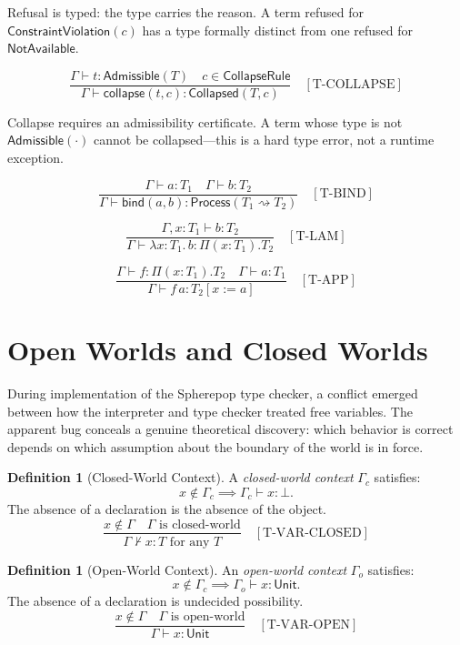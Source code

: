 \documentclass[12pt, a4paper, openany]{book}
\theoremstyle{plain}
\theoremstyle{definition}
\newtheorem{definition}[theorem]{Definition}
\theoremstyle{remark}
\newcommand{\Adm}{\mathsf{Admissible}}
\newcommand{\Col}{\mathsf{Collapsed}}
\newcommand{\Proc}{\mathsf{Process}}
\begin{document}
Refusal is typed: the type carries the reason. A term refused for
$\mathsf{ConstraintViolation}(c)$ has a type formally distinct from one refused
for $\mathsf{NotAvailable}$.

\[
\frac{\Gamma \vdash t : \Adm(T) \quad c \in \mathsf{CollapseRule}}{\Gamma \vdash \mathsf{collapse}(t, c) : \Col(T, c)} \quad [\mathrm{T\text{-}COLLAPSE}]
\]

Collapse requires an admissibility certificate. A term whose type is not
$\Adm(\cdot)$ cannot be collapsed---this is a hard type error, not a runtime
exception.

\[
\frac{\Gamma \vdash a : T_1 \quad \Gamma \vdash b : T_2}{\Gamma \vdash \mathsf{bind}(a, b) : \Proc(T_1 \rightsquigarrow T_2)} \quad [\mathrm{T\text{-}BIND}]
\]

\[
\frac{\Gamma, x : T_1 \vdash b : T_2}{\Gamma \vdash \lambda x : T_1.\, b : \Pi(x : T_1).T_2} \quad [\mathrm{T\text{-}LAM}]
\]

\[
\frac{\Gamma \vdash f : \Pi(x : T_1).T_2 \quad \Gamma \vdash a : T_1}{\Gamma \vdash f\, a : T_2[x := a]} \quad [\mathrm{T\text{-}APP}]
\]

\section{Open Worlds and Closed Worlds}

During implementation of the Spherepop type checker, a conflict emerged between
how the interpreter and type checker treated free variables. The apparent bug
conceals a genuine theoretical discovery: which behavior is correct depends on
which assumption about the boundary of the world is in force.

\begin{definition}[Closed-World Context]
A \emph{closed-world context} $\Gamma_c$ satisfies:
\[
x \notin \Gamma_c \implies \Gamma_c \vdash x : \bot.
\]
The absence of a declaration is the absence of the object.
\[
\frac{x \notin \Gamma \quad \Gamma \text{ is closed-world}}{\Gamma \not\vdash x : T \text{ for any } T} \quad [\mathrm{T\text{-}VAR\text{-}CLOSED}]
\]
\end{definition}

\begin{definition}[Open-World Context]
An \emph{open-world context} $\Gamma_o$ satisfies:
\[
x \notin \Gamma_c \implies \Gamma_o \vdash x : \mathsf{Unit}.
\]
The absence of a declaration is undecided possibility.
\[
\frac{x \notin \Gamma \quad \Gamma \text{ is open-world}}{\Gamma \vdash x : \mathsf{Unit}} \quad [\mathrm{T\text{-}VAR\text{-}OPEN}]
\]
\end{definition}
\end{document}
